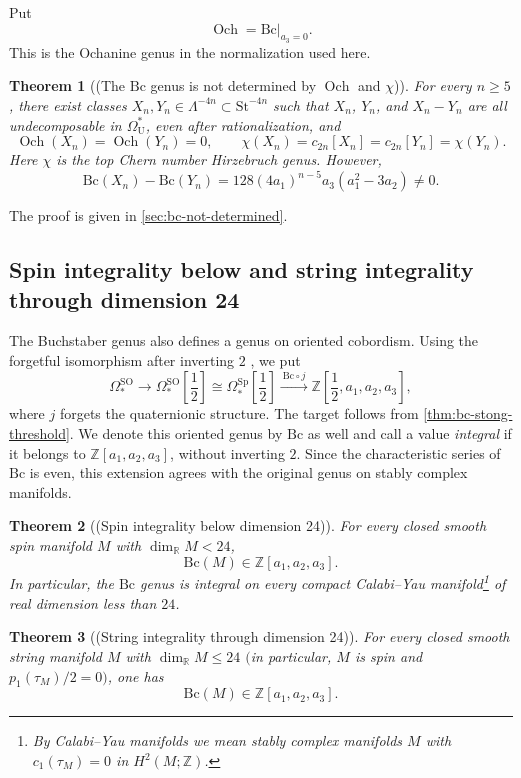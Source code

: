 \documentclass[14pt,dvipsnames]{extarticle}
\numberwithin{equation}{subsection}
\theoremstyle{plain}
\newtheorem{theorem}[theorem]{Theorem}
\theoremstyle{definition}
\theoremstyle{definition}
\DeclareMathOperator{\Och}{Och}
\newcommand{\OmU}{\Omega_{\mathrm U}^{\ast}}
\newcommand{\Sp}{\mathrm{Sp}}
\newcommand{\Bc}{\mathrm{Bc}}
\newcommand{\St}{\mathrm{St}}
\begin{document}
Put
\[
 \Och=\left.\Bc\right|_{a_3=0}.
\]
This is the Ochanine genus in the normalization used here.

\begin{theorem}[(The $\Bc$ genus is not determined by $\Och$ and $\chi$)]
\label{thm:bc-not-determined}
For every $n\geq5$, there exist classes
$X_n,Y_n\in\Lambda^{-4n}\subset\St^{-4n}$ such that $X_n$, $Y_n$, and
$X_n-Y_n$ are all undecomposable in $\OmU$, even after rationalization, and
\[
 \Och(X_n)=\Och(Y_n)=0,
 \qquad
 \chi(X_n)=c_{2n}[X_n]=c_{2n}[Y_n]=\chi(Y_n).
\]
Here $\chi$ is the top Chern number Hirzebruch genus. However,
\[
 \Bc(X_n)-\Bc(Y_n)
 =128(4a_1)^{n-5}a_3(a_1^2-3a_2)\ne0.
\]
\end{theorem}

The proof is given in \cref{sec:bc-not-determined}.

\subsection{Spin integrality below and string integrality through dimension 24}
\label{sec:spin-main}

The Buchstaber genus also defines a genus on oriented cobordism. Using the
forgetful isomorphism after inverting $2$ \cite{Sto67}, we put
\[
 \Omega_*^{\mathrm{SO}}\longrightarrow
 \Omega_*^{\mathrm{SO}}\!\left[\frac12\right]
 \cong\Omega_*^{\Sp}\!\left[\frac12\right]
 \xrightarrow{\ \Bc\circ j\ }
 \mathbb Z\!\left[\frac12,a_1,a_2,a_3\right],
\]
where $j$ forgets the quaternionic structure. The target follows from
\cref{thm:bc-stong-threshold}. We denote this oriented genus by $\Bc$ as well
and call a value \emph{integral} if it belongs to
$\mathbb Z[a_1,a_2,a_3]$, without inverting $2$. Since the characteristic
series of $\Bc$ is even, this extension agrees with the original genus on
stably complex manifolds.

\begin{theorem}[(Spin integrality below dimension 24)]
\label{thm:bc-spin-below24}
For every closed smooth spin manifold $M$ with $\dim_{\mathbb R}M<24$,
\[
 \Bc(M)\in\mathbb Z[a_1,a_2,a_3].
\]
In particular, the $\Bc$ genus is integral on every compact
Calabi--Yau manifold\footnote{By Calabi--Yau manifolds we mean stably complex manifolds $M$ with $c_1(\tau_M) = 0$ in $H^2(M;\mathbb Z)$.} of real dimension less
than $24$.
\end{theorem}

\begin{theorem}[(String integrality through dimension 24)]
\label{thm:bc-string-through24}
For every closed smooth string manifold $M$ with $\dim_{\mathbb R}M\leq24$
$($in particular, $M$ is spin and $p_1(\tau_M)/2=0)$, one has
\[
\Bc(M)\in\mathbb Z[a_1,a_2,a_3].
\]
\end{theorem}
\end{document}
